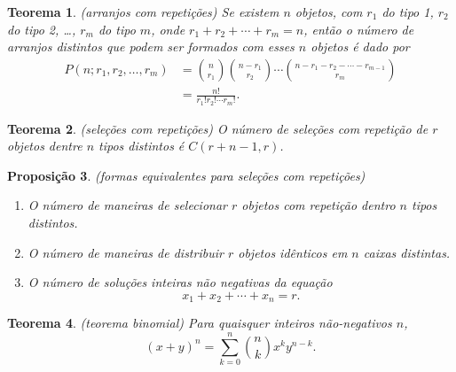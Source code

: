 \documentclass[12pt]{article}
\theoremstyle{plain}
\newtheorem{thm}{Teorema}[section]
\newtheorem{prop}[thm]{Proposição}
\theoremstyle{definition}
\theoremstyle{remark}
\begin{document}
\begin{thm} (arranjos com repetições)
    Se existem \(n\) objetos, com \(r_1\) do tipo 1, \(r_2\) do tipo 2, \ldots, \(r_m\) do tipo \(m\), onde \(r_1 + r_2 + \cdots + r_m = n\), então o número de arranjos distintos que podem ser formados com esses \(n\) objetos é dado por
    \begin{align}
        P(n;r_1,r_2,\ldots,r_m) &= \binom{n}{r_1}\binom{n-r_1}{r_2}\cdots\binom{n-r_1-r_2-\cdots-r_{m-1}}{r_m} \\
        &= \frac{n!}{r_1!r_2!\cdots r_m!}.
    \end{align}
\end{thm}

\begin{thm} (seleções com repetições)
    O número de seleções com repetição de \(r\) objetos dentre \(n\) tipos distintos é \(C(r+n-1,r)\).
\end{thm}

\begin{prop} (formas equivalentes para seleções com repetições)
    \begin{enumerate}
        \item O número de maneiras de selecionar \(r\) objetos com repetição dentro \(n\) tipos distintos.
        \item O número de maneiras de distribuir \(r\) objetos idênticos em \(n\) caixas distintas.
        \item O número de soluções inteiras não negativas da equação
        \begin{equation}
            x_1 + x_2 + \cdots + x_n = r.
        \end{equation}
    \end{enumerate}
\end{prop}

\begin{thm} (teorema binomial)
    Para quaisquer inteiros não-negativos \(n\),
    \begin{equation}
        (x+y)^n = \sum_{k=0}^{n} \binom{n}{k} x^k y^{n-k}.
    \end{equation}
\end{thm}
\end{document}

